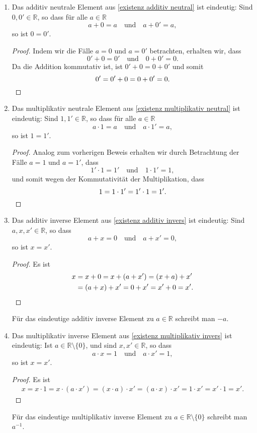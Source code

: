 \documentclass[a4paper,10pt]{article}
\newcommand{\R}{\mathbb{R}}
\begin{document}
 \begin{enumerate}
  \item
   Das additiv neutrale Element aus \ref{existenz additiv neutral} ist eindeutig: Sind $0, 0' \in \R$, so dass für alle $a \in \R$
   \[
    a + 0 = a \quad \text{und} \quad a + 0' = a,
   \]
   so ist $0 = 0'$.
   \begin{proof}
    Indem wir die Fälle $a = 0$ und $a = 0'$ betrachten, erhalten wir, dass
    \[
     0' + 0 = 0' \quad \text{und} \quad 0 + 0' = 0.
    \]
    Da die Addition kommutativ ist, ist $0' + 0 = 0 + 0'$ und somit
    \[
     0' = 0' + 0 = 0 + 0' = 0.
     \qedhere
    \]
   \end{proof}
  \item
   Das multiplikativ neutrale Element aus \ref{existenz multiplikativ neutral} ist eindeutig: Sind $1, 1' \in \R$, so dass für alle $a \in \R$
   \[
    a \cdot 1 = a \quad \text{und} \quad a \cdot 1' = a,
   \]
   so ist $1 = 1'$.
   \begin{proof}
    Analog zum vorherigen Beweis erhalten wir durch Betrachtung der Fälle $a = 1$ und $a = 1'$, dass
    \[
     1' \cdot 1 = 1' \quad \text{und} \quad 1 \cdot 1' = 1,
    \]
    und somit wegen der Kommutativität der Multiplikation, dass
    \[
     1 = 1 \cdot 1' = 1' \cdot 1 = 1'.
     \qedhere
    \]
   \end{proof}
  \item
   Das additiv inverse Element aus \ref{existenz additiv invers} ist eindeutig: Sind $a, x, x' \in \R$, so dass
   \[
    a + x = 0 \quad \text{und} \quad a + x' = 0,
   \]
   so ist $x = x'$.
   \begin{proof}
    Es ist
    \begin{align*}
     x
     &= x + 0
     = x + (a + x')
     = (x + a) + x' \\
     &= (a + x) + x'
     = 0 + x'
     = x' + 0
     = x'.
    \qedhere
    \end{align*}
   \end{proof}
   Für das eindeutige additiv inverse Element zu $a \in \R$ schreibt man $-a$.
  \item
   Das multiplikativ inverse Element aus \ref{existenz multiplikativ invers} ist eindeutig: Ist $a \in \R \setminus \{0\}$, und sind $x, x' \in \R$, so dass
   \[
    a \cdot x = 1 \quad \text{und} \quad a \cdot x' = 1,
   \]
   so ist $x = x'$.
   \begin{proof}
    Es ist
    \begin{align*}
     x
     = x \cdot 1
     = x \cdot (a \cdot x')
     = (x \cdot a) \cdot x'
     = (a \cdot x) \cdot x'
     = 1 \cdot x'
     = x' \cdot 1
     = x'.
    \end{align*}
   \end{proof}
   Für das eindeutige multiplikativ inverse Element zu $a \in \R \setminus \{0\}$ schreibt man $a^{-1}$.
 \end{enumerate}
 
\end{document}
